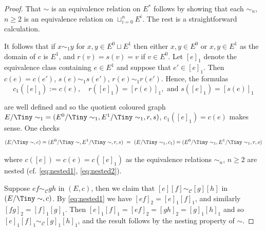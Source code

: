 \documentclass[10pt,a4paper]{amsart}
\newcommand{\Cc}{\mathcal{C}}
\begin{document}
\begin{proof}
That $\sim$ is an equivalence relation on $E^*$ follows by showing that each $\sim_n$, $n \ge2$ is an equivalence relation on $\sqcup_{i=0}^n E^i$. The rest is a straightforward calculation.

It follows that if $x \sim_1 y$ for $x,y \in E^0 \sqcup E^1$ then either $x,y \in E^0$ or $x,y \in E^1$ as the domain of $c$ is $E^1$, and $r(v)=s(v)=v$ if $v \in E^0$. Let $[e]_1$ denote the equivalence class containing $e \in E^1$ and suppose that $e' \in [e]_1$. Then $c(e) = c(e')$, $s(e) \sim_1 s(e')$, $r(e) \sim_1 r(e')$. Hence, the formulas
\[
c_1([e]_1) := c(e), \quad r([e]_1) = [r(e)]_1,\text{ and } s([e]_1) = [s(e)]_1
\]

\noindent
are well defined and so the quotient coloured graph $E/{\Tiny\sim_1}  = (E^0/{\Tiny\sim_1},E^1/{\Tiny\sim_1},r,s)$, $c_1([e]_1)=c(e)$ makes sense. One checks
\[
(E/{\Tiny\sim} ,c) = (E^0/{\Tiny\sim},E^1/{\Tiny\sim},r,s) ~=~ (E/{\Tiny\sim_1},c_1)   = (E^0/{\Tiny\sim_1},E^1/{\Tiny\sim_1},r,s)
\]

\noindent
where $c([e])=c(e)=c([e]_1)$ as the equivalence relations $\sim_n$, $n \ge 2$ are nested (cf. \eqref{eq:nested1}, \eqref{eq:nested2}). 

Suppose $ef \sim_\Cc gh$ in $(E,c)$, then we claim that $[e][f] \sim_\Cc [g][h]$ in $(E/{\Tiny\sim},c)$. By \eqref{eq:nested1} we have $[ef]_2 = [e]_1 [f]_1$, and similarly $[fg]_2 = [f]_1 [g]_1$. Then $[e]_1 [f]_1 = [ef]_2 = [gh]_2 = [g]_1 [h]_1$ and so $[e]_1 [f]_1 \sim_\Cc [g]_1 [h]_1$, and the result follows by the nesting property of $\sim$.
\end{proof}
\end{document}
